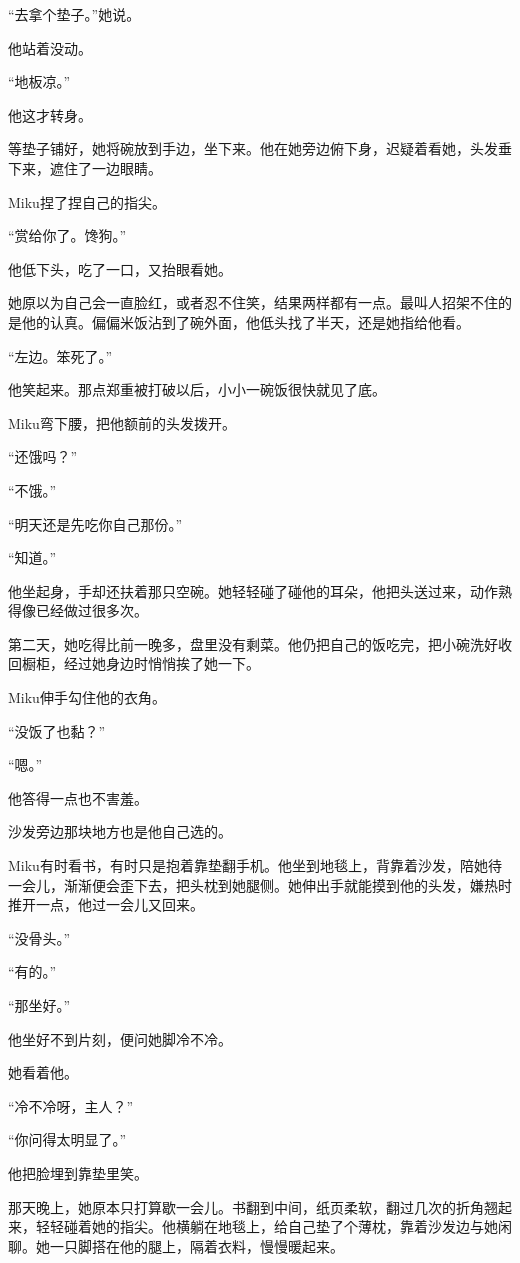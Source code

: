 “去拿个垫子。”她说。

他站着没动。

“地板凉。”

他这才转身。

等垫子铺好，她将碗放到手边，坐下来。他在她旁边俯下身，迟疑着看她，头发垂下来，遮住了一边眼睛。

Miku捏了捏自己的指尖。

“赏给你了。馋狗。”

他低下头，吃了一口，又抬眼看她。

她原以为自己会一直脸红，或者忍不住笑，结果两样都有一点。最叫人招架不住的是他的认真。偏偏米饭沾到了碗外面，他低头找了半天，还是她指给他看。

“左边。笨死了。”

他笑起来。那点郑重被打破以后，小小一碗饭很快就见了底。

Miku弯下腰，把他额前的头发拨开。

“还饿吗？”

“不饿。”

“明天还是先吃你自己那份。”

“知道。”

他坐起身，手却还扶着那只空碗。她轻轻碰了碰他的耳朵，他把头送过来，动作熟得像已经做过很多次。

第二天，她吃得比前一晚多，盘里没有剩菜。他仍把自己的饭吃完，把小碗洗好收回橱柜，经过她身边时悄悄挨了她一下。

Miku伸手勾住他的衣角。

“没饭了也黏？”

“嗯。”

他答得一点也不害羞。

\SceneBreak

沙发旁边那块地方也是他自己选的。

Miku有时看书，有时只是抱着靠垫翻手机。他坐到地毯上，背靠着沙发，陪她待一会儿，渐渐便会歪下去，把头枕到她腿侧。她伸出手就能摸到他的头发，嫌热时推开一点，他过一会儿又回来。

“没骨头。”

“有的。”

“那坐好。”

他坐好不到片刻，便问她脚冷不冷。

她看着他。

“冷不冷呀，主人？”

“你问得太明显了。”

他把脸埋到靠垫里笑。

那天晚上，她原本只打算歇一会儿。书翻到中间，纸页柔软，翻过几次的折角翘起来，轻轻碰着她的指尖。他横躺在地毯上，给自己垫了个薄枕，靠着沙发边与她闲聊。她一只脚搭在他的腿上，隔着衣料，慢慢暖起来。

